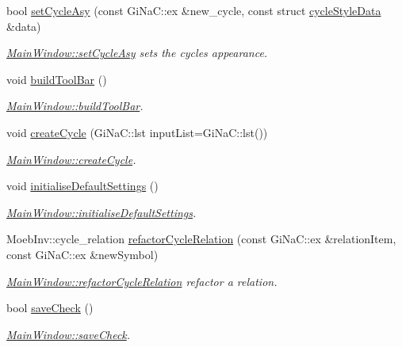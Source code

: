 \begin{DoxyCompactItemize}
bool \mbox{\hyperlink{class_main_window_a633c8594fbb906b2e914a4b3bbf50d97}{set\+Cycle\+Asy}} (const Gi\+Na\+C\+::ex \&new\+\_\+cycle, const struct \mbox{\hyperlink{structcycle_style_data}{cycle\+Style\+Data}} \&data)
\begin{DoxyCompactList}\small\item\em \mbox{\hyperlink{class_main_window_a633c8594fbb906b2e914a4b3bbf50d97}{Main\+Window\+::set\+Cycle\+Asy}} sets the cycles appearance. \end{DoxyCompactList}\item 
void \mbox{\hyperlink{class_main_window_a2e45b04e116068ed411c9738fbdc71ff}{build\+Tool\+Bar}} ()
\begin{DoxyCompactList}\small\item\em \mbox{\hyperlink{class_main_window_a2e45b04e116068ed411c9738fbdc71ff}{Main\+Window\+::build\+Tool\+Bar}}. \end{DoxyCompactList}\item 
void \mbox{\hyperlink{class_main_window_abc46822a29b8c97fbe12e030b30444f7}{create\+Cycle}} (Gi\+Na\+C\+::lst input\+List=Gi\+Na\+C\+::lst())
\begin{DoxyCompactList}\small\item\em \mbox{\hyperlink{class_main_window_abc46822a29b8c97fbe12e030b30444f7}{Main\+Window\+::create\+Cycle}}. \end{DoxyCompactList}\item 
void \mbox{\hyperlink{class_main_window_a72e9fc361f05240f439fb17ff78a40cc}{initialise\+Default\+Settings}} ()
\begin{DoxyCompactList}\small\item\em \mbox{\hyperlink{class_main_window_a72e9fc361f05240f439fb17ff78a40cc}{Main\+Window\+::initialise\+Default\+Settings}}. \end{DoxyCompactList}\item 
Moeb\+Inv\+::cycle\+\_\+relation \mbox{\hyperlink{class_main_window_a9fe708c683a2dd952ccb72e04cf4a62d}{refactor\+Cycle\+Relation}} (const Gi\+Na\+C\+::ex \&relation\+Item, const Gi\+Na\+C\+::ex \&new\+Symbol)
\begin{DoxyCompactList}\small\item\em \mbox{\hyperlink{class_main_window_a9fe708c683a2dd952ccb72e04cf4a62d}{Main\+Window\+::refactor\+Cycle\+Relation}} refactor a relation. \end{DoxyCompactList}\item 
bool \mbox{\hyperlink{class_main_window_ae2defb68c51e884b7031693b20bdd556}{save\+Check}} ()
\begin{DoxyCompactList}\small\item\em \mbox{\hyperlink{class_main_window_ae2defb68c51e884b7031693b20bdd556}{Main\+Window\+::save\+Check}}. \end{DoxyCompactList}\item 

\end{DoxyCompactItemize}
